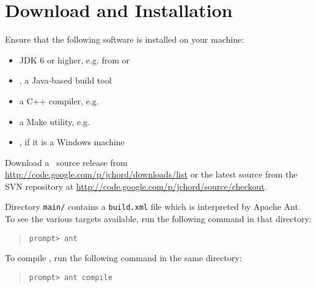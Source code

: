 \section{Download and Installation}
\label{sec:download-and-installation}

Ensure that the following software is installed on your machine:

\begin{itemize}
\item
JDK 6 or higher, e.g. from  or
\item
{}, a Java-based build tool
\item
a C++ compiler, e.g. 
\item
a Make utility, e.g. 
\item
{}, if it is a Windows machine
\end{itemize}

Download a \Chord\ source release from \url{http://code.google.com/p/jchord/downloads/list} or
the latest source from the SVN repository at \url{http://code.google.com/p/jchord/source/checkout}.

Directory {\tt main/} contains a {\tt build.xml} file which is interpreted by Apache Ant.
To see the various targets available, run the following command in that directory:

\begin{quote}
\begin{verbatim}
prompt> ant
\end{verbatim}
\end{quote}

\noindent To compile \Chord, run the following command in the same directory:

\begin{quote}
\begin{verbatim}
prompt> ant compile
\end{verbatim}
\end{quote}

